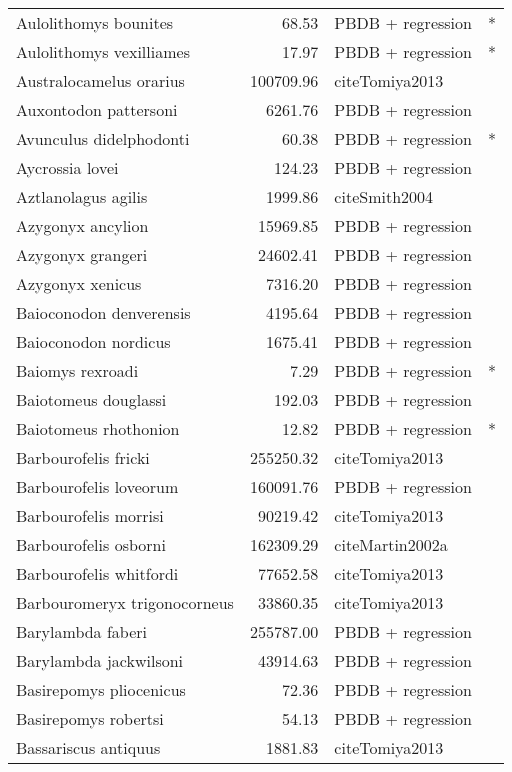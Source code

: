 \begin{table}[ht]
\begin{tabular}{lrll}
  Aulolithomys bounites & 68.53 & PBDB + regression & * \\ 
  Aulolithomys vexilliames & 17.97 & PBDB + regression & * \\ 
  Australocamelus orarius & 100709.96 & cite{Tomiya2013} &  \\ 
  Auxontodon pattersoni & 6261.76 & PBDB + regression &  \\ 
  Avunculus didelphodonti & 60.38 & PBDB + regression & * \\ 
  Aycrossia lovei & 124.23 & PBDB + regression &  \\ 
  Aztlanolagus agilis & 1999.86 & cite{Smith2004} &  \\ 
  Azygonyx ancylion & 15969.85 & PBDB + regression &  \\ 
  Azygonyx grangeri & 24602.41 & PBDB + regression &  \\ 
  Azygonyx xenicus & 7316.20 & PBDB + regression &  \\ 
  Baioconodon denverensis & 4195.64 & PBDB + regression &  \\ 
  Baioconodon nordicus & 1675.41 & PBDB + regression &  \\ 
  Baiomys rexroadi & 7.29 & PBDB + regression & * \\ 
  Baiotomeus douglassi & 192.03 & PBDB + regression &  \\ 
  Baiotomeus rhothonion & 12.82 & PBDB + regression & * \\ 
  Barbourofelis fricki & 255250.32 & cite{Tomiya2013} &  \\ 
  Barbourofelis loveorum & 160091.76 & PBDB + regression &  \\ 
  Barbourofelis morrisi & 90219.42 & cite{Tomiya2013} &  \\ 
  Barbourofelis osborni & 162309.29 & cite{Martin2002a} &  \\ 
  Barbourofelis whitfordi & 77652.58 & cite{Tomiya2013} &  \\ 
  Barbouromeryx trigonocorneus & 33860.35 & cite{Tomiya2013} &  \\ 
  Barylambda faberi & 255787.00 & PBDB + regression &  \\ 
  Barylambda jackwilsoni & 43914.63 & PBDB + regression &  \\ 
  Basirepomys pliocenicus & 72.36 & PBDB + regression &  \\ 
  Basirepomys robertsi & 54.13 & PBDB + regression &  \\ 
  Bassariscus antiquus & 1881.83 & cite{Tomiya2013} &  \\ 

\end{tabular}
\end{table}

